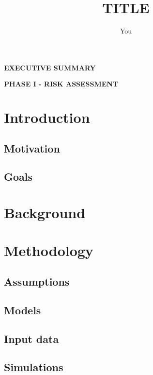 \documentclass[11pt,a4paper]{article}
\begin{document}
\begin{titlepage}
    \title{TITLE}
    \author{You}
\clearpage
\maketitle
\thispagestyle{empty}
\end{titlepage}

\textbf{EXECUTIVE SUMMARY}

\newpage

\begin{center}
    \textbf{PHASE I - RISK ASSESSMENT}
\end{center}

\newpage

\section{Introduction}
\subsection{Motivation}
\subsection{Goals}

\newpage

\section{Background}

\newpage

\section{Methodology}
\subsection{Assumptions}
\subsection{Models}
\subsection{Input data}
\subsection{Simulations}
\end{document}
